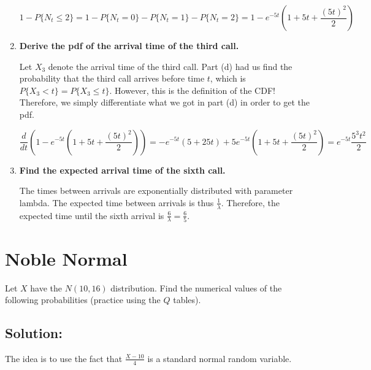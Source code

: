 \documentclass{article}
\begin{document}
\begin{enumerate}[label=(\alph*)]
    $$1 - P\{N_t \leq 2\} = 1 - P\{N_t = 0\} - P\{N_t = 1\} - P\{N_t = 2\} = \boxed{1 - e^{-5t}\left(1 + 5t + \frac{(5t)^2}{2}\right)}$$

    \vspace{2cm}
    
    \item \textbf{Derive the pdf of the arrival time of the third call.}

    Let $X_3$ denote the arrival time of the third call. Part (d) had us find the probability that the third call arrives before time $t$, which is $P\{X_3 < t\} = P\{X_3 \leq t\}$. However, this is the definition of the CDF! Therefore, we simply differentiate what we got in part (d) in order to get the pdf.

    $$\frac{d}{dt}\left(1 - e^{-5t}\left(1 + 5t + \frac{(5t)^2}{2}\right)\right) = -e^{-5t}(5 + 25t) + 5e^{-5t} \left(1 + 5t + \frac{(5t)^2}{2}\right) = \boxed{e^{-5t} \frac{5^3t^2}{2}}$$

    \vspace{2cm}
    
    \item \textbf{Find the expected arrival time of the sixth call.}

    The times between arrivals are exponentially distributed with parameter lambda. The expected time between arrivals is thus $\frac{1}{\lambda}$. Therefore, the expected time until the sixth arrival is $\frac{6}{\lambda} = \boxed{\frac{6}{5}}$.
    
\end{enumerate}

\newpage

\section{Noble Normal}

Let $X$ have the $N(10, 16)$ distribution. Find the numerical values of the following probabilities (practice using the $Q$ tables).

\subsection{Solution:}

The idea is to use the fact that $\frac{X - 10}{4}$ is a standard normal random variable.
\end{document}

